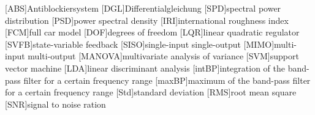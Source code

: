 
	\begin{acronym}
		[ABS]{Antiblockiersystem}
		[DGL]{Differentialgleichung}
		[SPD]{spectral power distribution}
        [PSD]{power spectral density}
        [IRI]{international roughness index}
        [FCM]{full car model}
        [DOF]{degrees of freedom}
        [LQR]{linear quadratic regulator}
        [SVFB]{state-variable feedback}
        [SISO]{single-input single-output}
        [MIMO]{multi-input multi-output}
        [MANOVA]{multivariate analysis of variance}
        [SVM]{support vector machine}
        [LDA]{linear discriminant analysis}
        [intBP]{integration of the band-pass filter for a certain frequency range}
        [maxBP]{maximum of the band-pass filter for a certain frequency range}
        [Std]{standard deviation}
        [RMS]{root mean square}
        [SNR]{signal to noise ration}
	\end{acronym}